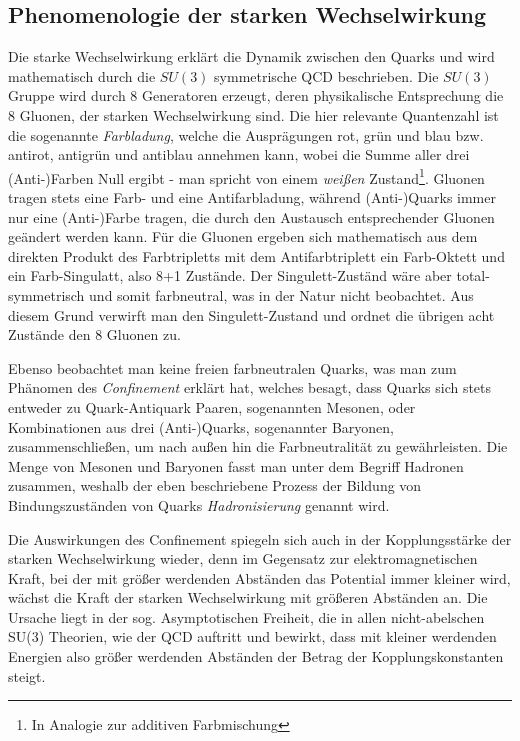 \subsection{Phenomenologie der starken Wechselwirkung}
Die starke Wechselwirkung erklärt die Dynamik zwischen den Quarks und wird
mathematisch durch die $SU(3)$ symmetrische \ac{QCD} beschrieben. Die $SU(3)$
Gruppe wird durch 8 Generatoren erzeugt, deren physikalische Entsprechung die 8
Gluonen, der starken Wechselwirkung sind. Die hier relevante Quantenzahl ist
die sogenannte \textit{Farbladung}, welche die Ausprägungen rot, grün und blau
bzw. antirot, antigrün und antiblau annehmen kann, wobei die Summe aller drei
(Anti-)Farben Null ergibt - man spricht von einem \textit{weißen}
Zustand\footnote{In Analogie zur additiven Farbmischung}. Gluonen tragen stets
eine Farb- und eine Antifarbladung, während (Anti-)Quarks immer nur eine
(Anti-)Farbe tragen, die durch den Austausch entsprechender Gluonen geändert
werden kann. Für die Gluonen ergeben sich mathematisch aus dem direkten Produkt
des Farbtripletts mit dem Antifarbtriplett ein Farb-Oktett und ein
Farb-Singulatt, also 8+1 Zustände. Der Singulett-Zuständ wäre aber
total-symmetrisch und somit farbneutral, was in der Natur nicht beobachtet. Aus
diesem Grund verwirft man den Singulett-Zustand und ordnet die übrigen acht
Zustände den 8 Gluonen zu.

Ebenso beobachtet man keine freien farbneutralen Quarks, was man zum Phänomen
des \textit{Confinement} erklärt hat, welches besagt, dass Quarks sich stets
entweder zu Quark-Antiquark Paaren, sogenannten Mesonen, oder Kombinationen aus
drei (Anti-)Quarks, sogenannter Baryonen, zusammenschließen, um nach außen hin
die Farbneutralität zu gewährleisten. Die Menge von Mesonen und Baryonen fasst
man unter dem Begriff Hadronen zusammen, weshalb der eben beschriebene Prozess
der Bildung von Bindungszuständen von Quarks \textit{Hadronisierung} genannt
wird.

Die Auswirkungen des Confinement spiegeln sich auch in der Kopplungsstärke der
starken Wechselwirkung wieder, denn im Gegensatz zur elektromagnetischen Kraft,
bei der mit größer werdenden Abständen das Potential immer kleiner wird, wächst
die Kraft der starken Wechselwirkung mit größeren Abständen an. Die Ursache
liegt in der sog. Asymptotischen Freiheit, die in allen nicht-abelschen SU(3)
Theorien, wie der QCD auftritt und bewirkt, dass mit kleiner werdenden Energien
also größer werdenden Abständen der Betrag der Kopplungskonstanten steigt.



